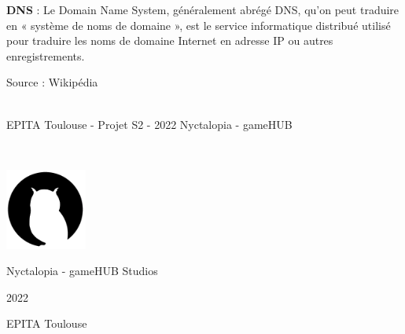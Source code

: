 \noindent \textbf{DNS} : Le Domain Name System, généralement abrégé DNS, qu'on peut traduire en « système de noms de domaine », est le service informatique distribué utilisé pour traduire les noms de domaine Internet en adresse IP ou autres enregistrements.

\hfill Source : Wikipédia

\vfill
\noindent\makebox[\linewidth]{\rule{.8\paperwidth}{.6pt}}\\[0.2cm]
EPITA Toulouse - Projet S2 - 2022 \hfill Nyctalopia - gameHUB
\noindent\makebox[\linewidth]{\rule{.8\paperwidth}{.6pt}}

\newpage

\thispagestyle{empty}
~
\vfill
\begin{center}
\includegraphics[width=0.2\textwidth]{img/logos/logo.png}

\large Nyctalopia - gameHUB Studios

\large 2022

\large EPITA Toulouse
\end{center}